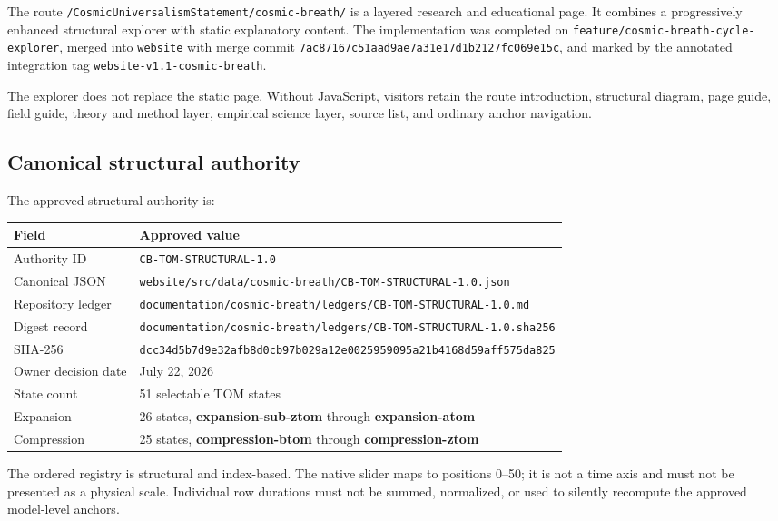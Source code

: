 \documentclass[11pt,letterpaper]{article}
\newcommand{\filepath}[1]{\nolinkurl{#1}}
\newcommand{\branchname}[1]{\texttt{#1}}
\newcommand{\term}[1]{\textbf{\textsf{#1}}}
\newcommand{\release}[1]{\texttt{#1}}
\begin{document}
The route \filepath{/CosmicUniversalismStatement/cosmic-breath/} is a layered
research and educational page. It combines a progressively enhanced structural
explorer with static explanatory content. The implementation was completed on
\branchname{feature/cosmic-breath-cycle-explorer}, merged into
\branchname{website} with merge commit
\filepath{7ac87167c51aad9ae7a31e17d1b2127fc069e15c}, and marked by the annotated
integration tag \release{website-v1.1-cosmic-breath}.

The explorer does not replace the static page. Without JavaScript, visitors
retain the route introduction, structural diagram, page guide, field guide,
theory and method layer, empirical science layer, source list, and ordinary
anchor navigation.

\subsection{Canonical structural authority}

The approved structural authority is:

\begin{tabularx}{\textwidth}{L{2.05in}Y}
\toprule
\textbf{Field} & \textbf{Approved value} \\
\midrule
Authority ID & \release{CB-TOM-STRUCTURAL-1.0} \\
Canonical JSON & \filepath{website/src/data/cosmic-breath/CB-TOM-STRUCTURAL-1.0.json} \\
Repository ledger & \filepath{documentation/cosmic-breath/ledgers/CB-TOM-STRUCTURAL-1.0.md} \\
Digest record & \filepath{documentation/cosmic-breath/ledgers/CB-TOM-STRUCTURAL-1.0.sha256} \\
SHA-256 & \filepath{dcc34d5b7d9e32afb8d0cb97b029a12e0025959095a21b4168d59aff575da825} \\
Owner decision date & July 22, 2026 \\
State count & 51 selectable TOM states \\
Expansion & 26 states, \term{expansion-sub-ztom} through \term{expansion-atom} \\
Compression & 25 states, \term{compression-btom} through \term{compression-ztom} \\
\bottomrule
\end{tabularx}

The ordered registry is structural and index-based. The native slider maps to
positions 0--50; it is not a time axis and must not be presented as a physical
scale. Individual row durations must not be summed, normalized, or used to
silently recompute the approved model-level anchors.
\end{document}
